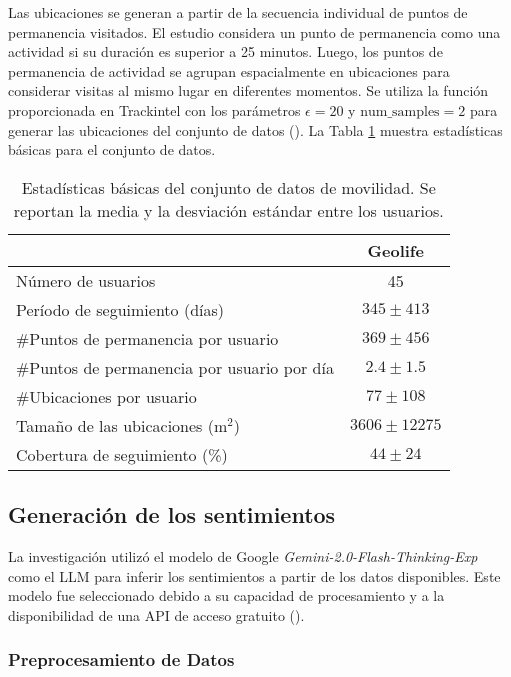 Las ubicaciones se generan a partir de la secuencia individual 
de puntos de permanencia visitados. El estudio considera un punto de permanencia como 
una actividad si su duraci\'on es superior a 25 minutos. Luego, los 
puntos de permanencia de actividad se agrupan espacialmente en ubicaciones 
para considerar visitas al mismo lugar en diferentes momentos. Se utiliza 
la funci\'on proporcionada en Trackintel con los par\'ametros 
$\epsilon = 20$ y $\text{num\_samples} = 2$ para generar las ubicaciones 
del conjunto de datos (\cite{Hong2021Clustering}). La Tabla \ref{tabla:estadisticas} 
muestra estad\'isticas b\'asicas para el conjunto de datos.\\

\begin{table}[h]
    \centering
    \caption{Estadísticas básicas del conjunto de datos de movilidad. Se reportan la media y la desviación estándar entre los usuarios.}
    \label{tabla:estadisticas}
    \begin{tabular}{lc}
        \hline
        & \textbf{Geolife} \\ \hline
        Número de usuarios & 45 \\
        Período de seguimiento (días) & $345 \pm 413$ \\
        \#Puntos de permanencia por usuario & $369 \pm 456$ \\
        \#Puntos de permanencia por usuario por día & $2.4 \pm 1.5$ \\
        \#Ubicaciones por usuario & $77 \pm 108$ \\
        Tamaño de las ubicaciones (m$^2$) & $3606 \pm 12275$ \\
        Cobertura de seguimiento (\%) & $44 \pm 24$ \\ \hline
    \end{tabular}
\end{table}

\subsection{Generaci\'on de los sentimientos}
La investigación utilizó el modelo de Google \textit{Gemini-2.0-Flash-Thinking-Exp} 
como el LLM para inferir los sentimientos a partir de 
los datos disponibles. Este modelo fue seleccionado debido a su capacidad de 
procesamiento y a la disponibilidad de una API de acceso gratuito (\cite{gemini_api_docs}).

\subsubsection{Preprocesamiento de Datos}

